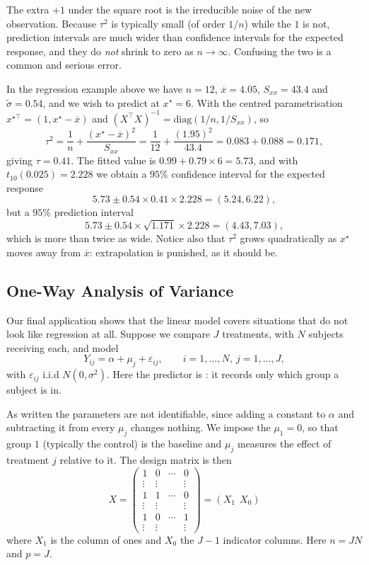 \documentclass[a4paper]{scrartcl}
\begin{document}
The extra $+1$ under the square root is the irreducible noise of the new observation. Because $\tau^2$ is typically small (of order $1/n$) while the $1$ is not, prediction intervals are much wider than confidence intervals for the expected response, and they do \emph{not} shrink to zero as $n \to\infty$. Confusing the two is a common and serious error.

\begin{example}
  In the regression example above we have $n = 12$, $\overline x = 4.05$, $S_{xx} = 43.4$ and $\tilde\sigma = 0.54$, and we wish to predict at $x^\star = 6$. With the centred parametrisation $x^{\star\top} = (1, x^\star - \overline{x})$ and $(X^\top X)^{-1} = \mathrm{diag}(1/n, 1/S_{xx})$, so
  $$
  \tau^2 = \frac1n + \frac{(x^\star - \overline x)^2}{S_{xx}} = \frac{1}{12} + \frac{(1.95)^2}{43.4} = 0.083+0.088 = 0.171,
  $$
  giving $\tau = 0.41$. The fitted value is $0.99+0.79\times 6 = 5.73$, and with $t_{10}(0.025) = 2.228$ we obtain a $95\%$ confidence interval for the expected response
  $$
  5.73 \pm 0.54\times 0.41\times 2.228 = (5.24, 6.22),
  $$
  but a $95\%$ prediction interval
  $$
  5.73 \pm 0.54\times\sqrt{1.171}\times 2.228 = (4.43, 7.03),
  $$
  which is more than twice as wide. Notice also that $\tau^2$ grows quadratically as $x^\star$ moves away from $\overline{x}$: extrapolation is punished, as it should be.
\end{example}

\subsection{One-Way Analysis of Variance}

Our final application shows that the linear model covers situations that do not look like regression at all. Suppose we compare $J$ treatments, with $N$ subjects receiving each, and model
$$
Y_{ij} = \alpha + \mu_j + \varepsilon_{ij}, \qquad i = 1,\dots,N,\ j = 1,\dots,J,
$$
with $\varepsilon_{ij}$ i.i.d $N(0,\sigma^2)$. Here the predictor is : it records only which group a subject is in.

As written the parameters are not identifiable, since adding a constant to $\alpha$ and subtracting it from every $\mu_j$ changes nothing. We impose the  $\mu_1 = 0$, so that group $1$ (typically the control) is the baseline and $\mu_j$ measures the effect of treatment $j$ relative to it. The design matrix is then
$$
X = \begin{pmatrix}
1 & 0 &\cdots& 0\\
\vdots&\vdots& &\vdots\\
1 & 1 &\cdots& 0\\
\vdots&\vdots& &\vdots\\
1 & 0 &\cdots& 1\\
\vdots&\vdots& &\vdots
\end{pmatrix} = \left(X_1\ \ X_0\right)
$$
where $X_1$ is the column of ones and $X_0$ the $J-1$ indicator columns. Here $n = JN$ and $p = J$.
\end{document}
